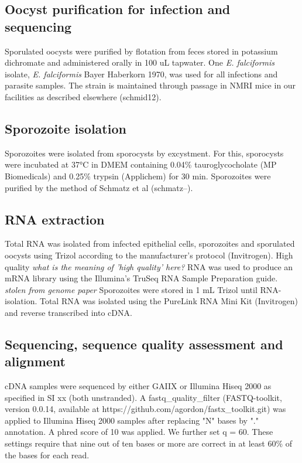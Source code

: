 \documentclass{bmcart}
\begin{document}
\subsection{Oocyst purification for infection and sequencing}
Sporulated oocysts were purified by flotation from feces stored in potassium dichromate and 
administered orally in 100 uL tapwater. One \textit{E. falciformis} isolate, 
\textit{E. falciformis} Bayer Haberkorn 1970, was used for all infections and parasite 
samples. The strain is maintained through passage in NMRI mice in our facilities as described 
elsewhere (schmid12).

\subsection{Sporozoite isolation}
Sporozoites were isolated from sporocysts by excystment. For this, sporocysts were incubated at 
37$°$C in DMEM containing 0.04\% tauroglycocholate (MP Biomedicals) and 0.25\% trypsin (Applichem) 
for 30 min. Sporozoites were purified by the method of Schmatz et al (schmatz--).

\subsection{RNA extraction}
Total RNA was isolated from infected epithelial cells, sporozoites and sporulated oocysts 
using Trizol according to the manufacturer’s protocol (Invitrogen). High quality  \emph{what is the meaning of 'high quality' here?}
RNA was used to produce an mRNA library using the Illumina’s TruSeq RNA Sample Preparation guide.
\emph{stolen from genome paper}
Sporozoites were stored in 1 mL Trizol until RNA-isolation. 
Total RNA was isolated using the PureLink RNA Mini Kit (Invitrogen) and reverse transcribed into cDNA.

\subsection{Sequencing, sequence quality assessment and alignment}
cDNA samples were sequenced by either GAIIX or Illumina Hiseq 2000 as specified in SI xx (both unstranded). A fastq\_quality\_filter (FASTQ-toolkit, version 0.0.14, available at https://github.com/agordon/fastx\_toolkit.git) was applied to Illumina Hiseq 2000 samples after replacing "N" bases by "." annotation.  
A phred score of 10 was applied. We further set q = 60. These settings require that nine out of ten bases
or more are correct in at least 60\% of the bases for each read.
\end{document}
